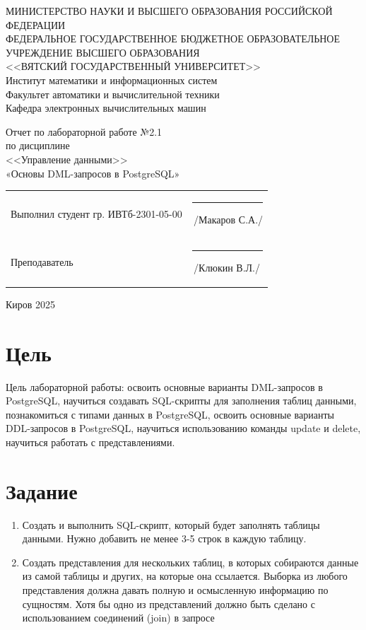 \documentclass[a4paper,14pt]{extarticle}
\begin{document}
  \newpage\thispagestyle{empty}
  \begin{center}
    \MakeUppercase{
      Министерство науки и высшего образования Российской Федерации\\
      Федеральное государственное бюджетное образовательное учреждение высшего образования\\
      <<Вятский Государственный Университет>>\\
    }
    Институт математики и информационных систем\\
    Факультет автоматики и вычислительной техники\\
    Кафедра электронных вычислительных машин
  \end{center}
  \vfill

  \begin{center}
    Отчет по лабораторной работе №2.1\\
    по дисциплине\\
    <<Управление данными>>\\
    «Основы DML-запросов в PostgreSQL»\\
  \end{center}
  \vfill

  \noindent
  \begin{tabular}{ll}
    Выполнил студент гр. ИВТб-2301-05-00 \hspace{5mm} &
    \rule[-1mm]{25mm}{0.10mm}\,/Макаров С.А./\\
    
    Преподаватель & \rule[-1mm]{25mm}{0.10mm}\,/Клюкин В.Л./\\
  \end{tabular}

  \vfill
  \begin{center}
    Киров 2025
  \end{center}

  \newpage
  \section*{Цель}
  Цель лабораторной работы: освоить основные варианты DML-запросов в PostgreSQL, научиться создавать SQL-скрипты для заполнения таблиц данными, познакомиться с типами данных в PostgreSQL, освоить основные варианты DDL-запросов в PostgreSQL, научиться использованию команды update и delete, научиться работать с представлениями.

  \section*{Задание}
  \begin{enumerate}
    \item Создать и выполнить SQL-скрипт, который будет заполнять таблицы данными. Нужно добавить не менее 3-5 строк в каждую таблицу.
    \item Создать представления для нескольких таблиц, в которых собираются данные из самой таблицы и других, на которые она ссылается. Выборка из любого представления должна давать полную и осмысленную информацию по сущностям. Хотя бы одно из представлений должно быть сделано с использованием соединений (join) в запросе
  \end{enumerate}
\end{document}
